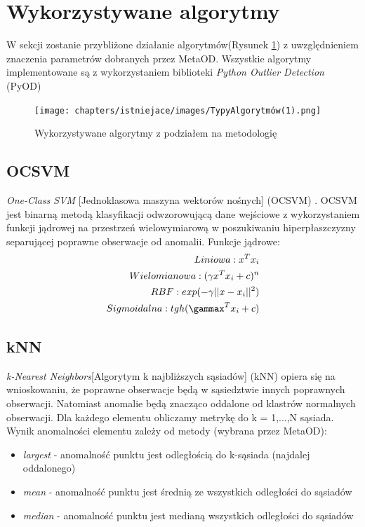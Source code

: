 \section{Wykorzystywane algorytmy}
W sekcji zostanie przybliżone działanie algorytmów(Rysunek \ref{fig:typy}) z uwzględnieniem znaczenia parametrów dobranych przez MetaOD.
Wszystkie algorytmy implementowane są z wykorzystaniem biblioteki \textit{Python Outlier Detection} (PyOD) \cite{zhao2019pyod}
\begin{figure}
    \centering
    \texttt{[image: chapters/istniejace/images/TypyAlgorytmów(1).png]}
    \caption{Wykorzystywane algorytmy z podziałem na metodologię}
    \label{fig:typy}
\end{figure}

\subsection{OCSVM}
\textit{One-Class SVM} [Jednoklasowa maszyna wektorów nośnych] (OCSVM) \cite{ocsvm}. OCSVM jest binarną metodą klasyfikacji odwzorowującą dane wejściowe z wykorzystaniem funkcji jądrowej na przestrzeń wielowymiarową w poszukiwaniu hiperpłaszczyzny separującej poprawne obserwacje od anomalii.  
Funkcje jądrowe:
\begin{align*}
    Liniowa: x^Tx_i \\
    Wielomianowa: (\gamma x^Tx_i+c)^n \\
    RBF: exp(-\gamma ||x-x_i||^2) \\
    Sigmoidalna: tgh(\gammax^Tx_i+c)
\end{align*}
\label{eq:funjadro}

\subsection{kNN}
\textit{k-Nearest Neighbors}[Algorytym k najbliższych sąsiadów] (kNN) \cite{knn} opiera się na wnioskowaniu, że poprawne obserwacje będą w sąsiedztwie innych poprawnych obserwacji. Natomiast anomalie będą znacząco oddalone od klastrów normalnych obserwacji. Dla każdego elementu obliczamy metrykę do k = 1,...,N sąsiada. Wynik anomalności elementu zależy od metody (wybrana przez MetaOD):
\begin{itemize}
    \item \textit{largest} - anomalność punktu jest odległością do k-sąsiada (najdalej oddalonego)
    \item \textit{mean} - anomalność punktu jest średnią ze wszystkich odległości do sąsiadów
    \item \textit{median} - anomalność punktu jest medianą wszystkich odległości do sąsiadów
\end{itemize}

